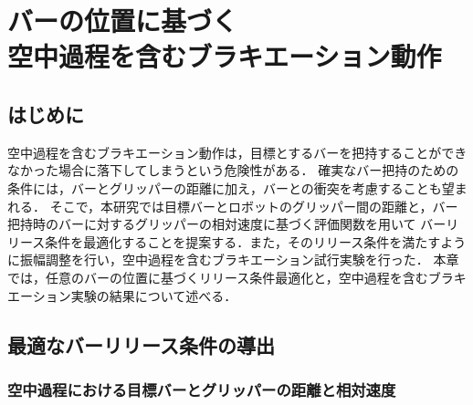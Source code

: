 \chapter[バーの位置に基づく空中過程を含むブラキエーション動作]%
{バーの位置に基づく\\空中過程を含むブラキエーション動作}
      \section{はじめに}
      

      空中過程を含むブラキエーション動作は，目標とするバーを把持することができなかった場合に落下してしまうという危険性がある．
      確実なバー把持のための条件には，バーとグリッパーの距離に加え，バーとの衝突を考慮することも望まれる．
      そこで，本研究では目標バーとロボットのグリッパー間の距離と，バー把持時のバーに対するグリッパーの相対速度に基づく評価関数を用いて
      バーリリース条件を最適化することを提案する．また，そのリリース条件を満たすように振幅調整を行い，空中過程を含むブラキエーション試行実験を行った．
      本章では，任意のバーの位置に基づくリリース条件最適化と，空中過程を含むブラキエーション実験の結果について述べる．

      \section{最適なバーリリース条件の導出}
        \subsection{空中過程における目標バーとグリッパーの距離と相対速度}

